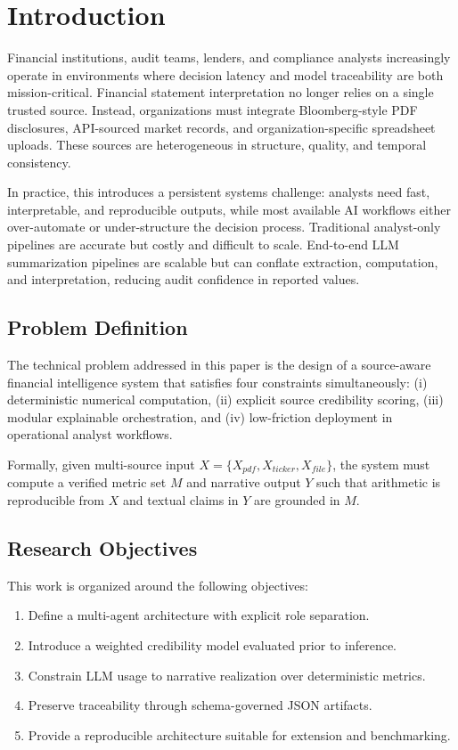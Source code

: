 \documentclass[conference]{IEEEtran}
\begin{document}
\section{Introduction}
Financial institutions, audit teams, lenders, and compliance analysts increasingly operate in environments where decision latency and model traceability are both mission-critical. Financial statement interpretation no longer relies on a single trusted source. Instead, organizations must integrate Bloomberg-style PDF disclosures, API-sourced market records, and organization-specific spreadsheet uploads. These sources are heterogeneous in structure, quality, and temporal consistency.

In practice, this introduces a persistent systems challenge: analysts need fast, interpretable, and reproducible outputs, while most available AI workflows either over-automate or under-structure the decision process. Traditional analyst-only pipelines are accurate but costly and difficult to scale. End-to-end LLM summarization pipelines are scalable but can conflate extraction, computation, and interpretation, reducing audit confidence in reported values.

\subsection{Problem Definition}
The technical problem addressed in this paper is the design of a source-aware financial intelligence system that satisfies four constraints simultaneously: (i) deterministic numerical computation, (ii) explicit source credibility scoring, (iii) modular explainable orchestration, and (iv) low-friction deployment in operational analyst workflows.

Formally, given multi-source input $X=\{X_{pdf},X_{ticker},X_{file}\}$, the system must compute a verified metric set $M$ and narrative output $Y$ such that arithmetic is reproducible from $X$ and textual claims in $Y$ are grounded in $M$.

\subsection{Research Objectives}
This work is organized around the following objectives:
\begin{enumerate}
    \item Define a multi-agent architecture with explicit role separation.
    \item Introduce a weighted credibility model evaluated prior to inference.
    \item Constrain LLM usage to narrative realization over deterministic metrics.
    \item Preserve traceability through schema-governed JSON artifacts.
    \item Provide a reproducible architecture suitable for extension and benchmarking.
\end{enumerate}
\end{document}
